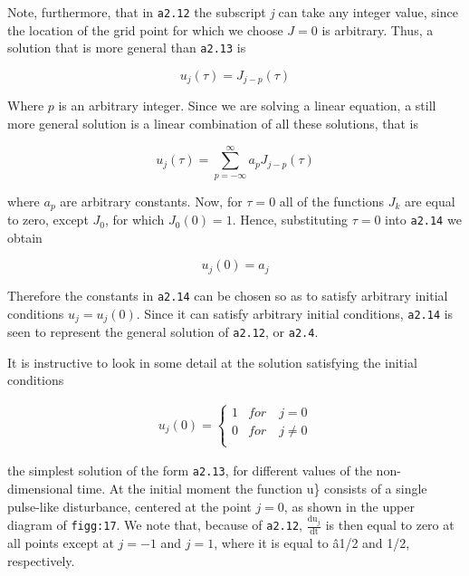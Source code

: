 Note, furthermore, that in \texttt{a2.12} the subscript \emph{j} can
take any integer value, since the location of the grid point for which
we choose \(J = 0\) is arbitrary. Thus, a solution that is more general
than \texttt{a2.13} is

\[u_{j}\left( \tau \right) = J_{j - p}\left( \tau \right)\]

\begin{figure}
\centering
{}
\caption{}
\end{figure}

Where \(p\) is an arbitrary integer. Since we are solving a linear
equation, a still more general solution is a linear combination of all
these solutions, that is

{\[u_{j}\left( \tau \right) = \sum_{p = - \infty}^{\infty}{a_{p}J_{j - p}}\left( \tau \right)\]}

where \(a_{p}\) are arbitrary constants. Now, for \(\tau = 0\) all of
the functions \(J_{k}\) are equal to zero, except \(J_{0}\), for which
\(J_{0}\left( 0 \right) = 1\). Hence, substituting \(\tau = 0\) into
\texttt{a2.14} we obtain

{\[u_{j}\left( 0 \right) = a_{j}\]}

Therefore the constants in \texttt{a2.14} can be chosen so as to satisfy
arbitrary initial conditions \(u_{j} = u_{j}\left( 0 \right)\). Since it
can satisfy arbitrary initial conditions, \texttt{a2.14} is seen to
represent the general solution of \texttt{a2.12}, or \texttt{a2.4}.

It is instructive to look in some detail at the solution satisfying the
initial conditions

{\[\begin{aligned}
u_{j}\left( 0 \right) = \left\{ \begin{array}{cc}
1  &  for \quad j = 0\\
0  &  for \quad j \neq 0\\
\end{array} \right.
\end{aligned}\]}

the simplest solution of the form \texttt{a2.13}, for different values
of the non-dimensional time. At the initial moment the function u\}
consists of a single pulse-like disturbance, centered at the point
\(j = 0\), as shown in the upper diagram of \texttt{figg:17}. We note
that, because of \texttt{a2.12}, \(\frac{\text{du}_{j}}{\text{dt}}\) is
then equal to zero at all points except at \(j = - 1\) and \(j = 1\),
where it is equal to â1/2 and 1/2, respectively.

